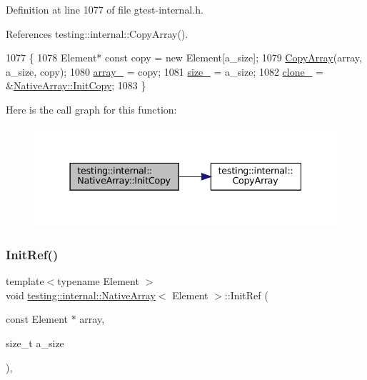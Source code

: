 Definition at line 1077 of file gtest-\/internal.\+h.



References testing\+::internal\+::\+Copy\+Array().


\begin{DoxyCode}
1077                                                      \{
1078     Element* \textcolor{keyword}{const} copy = \textcolor{keyword}{new} Element[a\_size];
1079     \hyperlink{namespacetesting_1_1internal_afb1b9728aaaf6d9fe6246a19cfe3f7f5}{CopyArray}(array, a\_size, copy);
1080     \hyperlink{classtesting_1_1internal_1_1NativeArray_adadc025fbbbd43904d4036991019f18f}{array\_} = copy;
1081     \hyperlink{classtesting_1_1internal_1_1NativeArray_aa7e4251de39aaa75f697f0eaeedbf06e}{size\_} = a\_size;
1082     \hyperlink{classtesting_1_1internal_1_1NativeArray_addd7442a10398a60215a9989bcbd8078}{clone\_} = &\hyperlink{classtesting_1_1internal_1_1NativeArray_a8c0069cc09f559785fe4923fc118056f}{NativeArray::InitCopy};
1083   \}
\end{DoxyCode}
Here is the call graph for this function\+:
\nopagebreak
\begin{figure}[H]
\begin{center}
\leavevmode
\includegraphics[width=337pt]{classtesting_1_1internal_1_1NativeArray_a8c0069cc09f559785fe4923fc118056f_cgraph}
\end{center}
\end{figure}
\mbox{\label{classtesting_1_1internal_1_1NativeArray_ac6ad6d79e17e2c98a9d4d684afcb7f79}} 
\subsubsection{\texorpdfstring{Init\+Ref()}{InitRef()}}
{\footnotesize\ttfamily template$<$typename Element $>$ \\
void \hyperlink{classtesting_1_1internal_1_1NativeArray}{testing\+::internal\+::\+Native\+Array}$<$ Element $>$\+::Init\+Ref (\begin{DoxyParamCaption}\item[{const Element $\ast$}]{array,  }\item[{size\+\_\+t}]{a\+\_\+size }\end{DoxyParamCaption})\hspace{0.3cm}{\ttfamily [inline]}, {\ttfamily [private]}}



